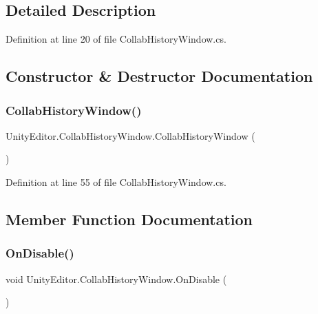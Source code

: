 \subsection{Detailed Description}


Definition at line 20 of file Collab\+History\+Window.\+cs.



\subsection{Constructor \& Destructor Documentation}
\mbox{\label{class_unity_editor_1_1_collab_history_window_ae8152d2af9a699452d676ef6beb7ee8d}} 
\subsubsection{\texorpdfstring{CollabHistoryWindow()}{CollabHistoryWindow()}}
{\footnotesize\ttfamily Unity\+Editor.\+Collab\+History\+Window.\+Collab\+History\+Window (\begin{DoxyParamCaption}{ }\end{DoxyParamCaption})}



Definition at line 55 of file Collab\+History\+Window.\+cs.



\subsection{Member Function Documentation}
\mbox{\label{class_unity_editor_1_1_collab_history_window_abc4317801a0bf1e182864cdc9c549279}} 
\subsubsection{\texorpdfstring{OnDisable()}{OnDisable()}}
{\footnotesize\ttfamily void Unity\+Editor.\+Collab\+History\+Window.\+On\+Disable (\begin{DoxyParamCaption}{ }\end{DoxyParamCaption})}



